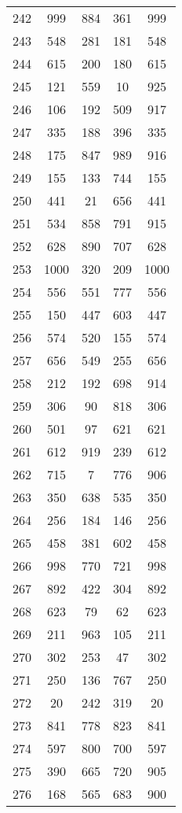 \documentclass[a4paper,10pt,ngerman]{scrartcl}
\begin{document}
\begin{longtable}[c]{c|c|c|c|c}
    242 & 999 & 884 & 361 & 999 \\
    243 & 548 & 281 & 181 & 548 \\
    244 & 615 & 200 & 180 & 615 \\
    245 & 121 & 559 & 10 & 925 \\
    246 & 106 & 192 & 509 & 917 \\
    247 & 335 & 188 & 396 & 335 \\
    248 & 175 & 847 & 989 & 916 \\
    249 & 155 & 133 & 744 & 155 \\
    250 & 441 & 21 & 656 & 441 \\
    251 & 534 & 858 & 791 & 915 \\
    252 & 628 & 890 & 707 & 628 \\
    253 & 1000 & 320 & 209 & 1000 \\
    254 & 556 & 551 & 777 & 556 \\
    255 & 150 & 447 & 603 & 447 \\
    256 & 574 & 520 & 155 & 574 \\
    257 & 656 & 549 & 255 & 656 \\
    258 & 212 & 192 & 698 & 914 \\
    259 & 306 & 90 & 818 & 306 \\
    260 & 501 & 97 & 621 & 621 \\
    261 & 612 & 919 & 239 & 612 \\
    262 & 715 & 7 & 776 & 906 \\
    263 & 350 & 638 & 535 & 350 \\
    264 & 256 & 184 & 146 & 256 \\
    265 & 458 & 381 & 602 & 458 \\
    266 & 998 & 770 & 721 & 998 \\
    267 & 892 & 422 & 304 & 892 \\
    268 & 623 & 79 & 62 & 623 \\
    269 & 211 & 963 & 105 & 211 \\
    270 & 302 & 253 & 47 & 302 \\
    271 & 250 & 136 & 767 & 250 \\
    272 & 20 & 242 & 319 & 20 \\
    273 & 841 & 778 & 823 & 841 \\
    274 & 597 & 800 & 700 & 597 \\
    275 & 390 & 665 & 720 & 905 \\
    276 & 168 & 565 & 683 & 900 \\

\end{longtable}
\end{document}
